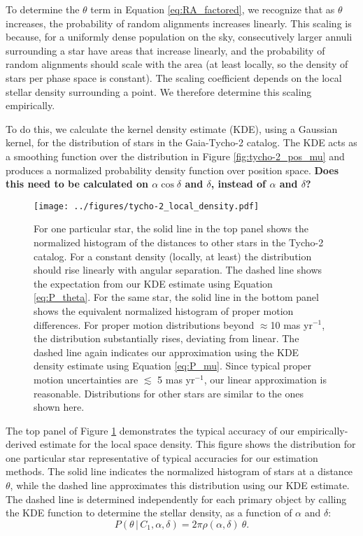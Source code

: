 \documentclass[usenatbib]{mnras}
\newcommand{\given}{\,|\,}
\begin{document}
To determine the $\theta$ term in Equation \ref{eq:RA_factored}, we recognize that as $\theta$ increases, the probability of random alignments increases linearly. This scaling is because, for a uniformly dense population on the sky, consecutively larger annuli surrounding a star have areas that increase linearly, and the probability of random alignments should scale with the area (at least locally, so the density of stars per phase space is constant). The scaling coefficient depends on the local stellar density surrounding a point. We therefore determine this scaling empirically. 

To do this, we calculate the kernel density estimate (KDE), using a Gaussian kernel, for the distribution of stars in the Gaia-Tycho-2 catalog. The KDE acts as a smoothing function over the distribution in Figure \ref{fig:tycho-2_pos_mu} and produces a normalized probability density function over position space. {\bf Does this need to be calculated on $\alpha \cos \delta$ and $\delta$, instead of $\alpha$ and $\delta$?}

\begin{figure}
\begin{center}
\texttt{[image: ../figures/tycho-2\_local\_density.pdf]}
\caption{ For one particular star, the solid line in the top panel shows the normalized histogram of the distances to other stars in the Tycho-2 catalog. For a constant density (locally, at least) the distribution should rise linearly with angular separation. The dashed line shows the expectation from our KDE estimate using Equation \ref{eq:P_theta}. For the same star, the solid line in the bottom panel shows the equivalent normalized histogram of proper motion differences. For proper motion distributions beyond $\approx$10 mas yr$^{-1}$, the distribution substantially rises, deviating from linear. The dashed line again indicates our approximation using the KDE density estimate using Equation \ref{eq:P_mu}. Since typical proper motion uncertainties are $\lesssim$ 5 mas yr$^{-1}$, our linear approximation is reasonable. Distributions for other stars are similar to the ones shown here.}
\label{fig:tycho-2_density}
\end{center}
\end{figure}

The top panel of Figure \ref{fig:tycho-2_density} demonstrates the typical accuracy of our empirically-derived estimate for the local space density. This figure shows the distribution for one particular star representative of typical accuracies for our estimation methods. The solid line indicates the normalized histogram of stars at a distance $\theta$, while the dashed line approximates this distribution using our KDE estimate. The dashed line is determined independently for each primary object by calling the KDE function to determine the stellar density, as a function of $\alpha$ and $\delta$:
\begin{equation}
P(\theta \given C_1, \alpha, \delta) = 2 \pi \rho(\alpha, \delta)\ \theta. \label{eq:P_theta}
\end{equation}
\end{document}
